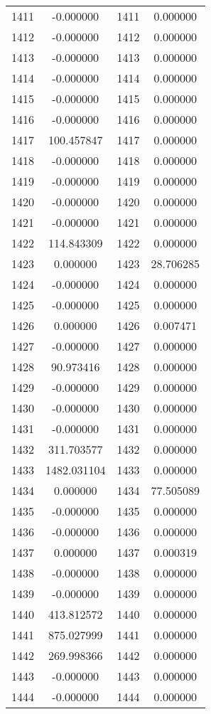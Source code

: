 \documentclass[12pt]{article}
\begin{document}
\begin{longtable}{@{}cccc@{}}
1411 & -0.000000 & 1411 & 0.000000 \\
1412 & -0.000000 & 1412 & 0.000000 \\
1413 & -0.000000 & 1413 & 0.000000 \\
1414 & -0.000000 & 1414 & 0.000000 \\
1415 & -0.000000 & 1415 & 0.000000 \\
1416 & -0.000000 & 1416 & 0.000000 \\
1417 & 100.457847 & 1417 & 0.000000 \\
1418 & -0.000000 & 1418 & 0.000000 \\
1419 & -0.000000 & 1419 & 0.000000 \\
1420 & -0.000000 & 1420 & 0.000000 \\
1421 & -0.000000 & 1421 & 0.000000 \\
1422 & 114.843309 & 1422 & 0.000000 \\
1423 & 0.000000 & 1423 & 28.706285 \\
1424 & -0.000000 & 1424 & 0.000000 \\
1425 & -0.000000 & 1425 & 0.000000 \\
1426 & 0.000000 & 1426 & 0.007471 \\
1427 & -0.000000 & 1427 & 0.000000 \\
1428 & 90.973416 & 1428 & 0.000000 \\
1429 & -0.000000 & 1429 & 0.000000 \\
1430 & -0.000000 & 1430 & 0.000000 \\
1431 & -0.000000 & 1431 & 0.000000 \\
1432 & 311.703577 & 1432 & 0.000000 \\
1433 & 1482.031104 & 1433 & 0.000000 \\
1434 & 0.000000 & 1434 & 77.505089 \\
1435 & -0.000000 & 1435 & 0.000000 \\
1436 & -0.000000 & 1436 & 0.000000 \\
1437 & 0.000000 & 1437 & 0.000319 \\
1438 & -0.000000 & 1438 & 0.000000 \\
1439 & -0.000000 & 1439 & 0.000000 \\
1440 & 413.812572 & 1440 & 0.000000 \\
1441 & 875.027999 & 1441 & 0.000000 \\
1442 & 269.998366 & 1442 & 0.000000 \\
1443 & -0.000000 & 1443 & 0.000000 \\
1444 & -0.000000 & 1444 & 0.000000 \\

\end{longtable}
\end{document}
